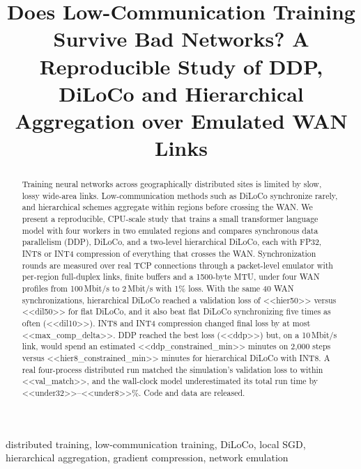 \documentclass[conference]{IEEEtran}
\begin{document}
\title{Does Low-Communication Training Survive Bad Networks? A Reproducible Study of DDP, DiLoCo and Hierarchical Aggregation over Emulated WAN Links}

\author{
}

\maketitle

\begin{abstract}
Training neural networks across geographically distributed sites is limited by slow, lossy wide-area links. Low-communication methods such as DiLoCo synchronize rarely, and hierarchical schemes aggregate within regions before crossing the WAN. We present a reproducible, CPU-scale study that trains a small transformer language model with four workers in two emulated regions and compares synchronous data parallelism (DDP), DiLoCo, and a two-level hierarchical DiLoCo, each with FP32, INT8 or INT4 compression of everything that crosses the WAN. Synchronization rounds are measured over real TCP connections through a packet-level emulator with per-region full-duplex links, finite buffers and a 1500-byte MTU, under four WAN profiles from 100\,Mbit/s to 2\,Mbit/s with 1\% loss. With the same 40 WAN synchronizations, hierarchical DiLoCo reached a validation loss of <<hier50>> versus <<dil50>> for flat DiLoCo, and it also beat flat DiLoCo synchronizing five times as often (<<dil10>>). INT8 and INT4 compression changed final loss by at most <<max_comp_delta>>. DDP reached the best loss (<<ddp>>) but, on a 10\,Mbit/s link, would spend an estimated <<ddp_constrained_min>> minutes on 2,000 steps versus <<hier8_constrained_min>> minutes for hierarchical DiLoCo with INT8. A real four-process distributed run matched the simulation's validation loss to within <<val_match>>, and the wall-clock model underestimated its total run time by <<under32>>--<<under8>>\%. Code and data are released.
\end{abstract}

\begin{IEEEkeywords}
distributed training, low-communication training, DiLoCo, local SGD, hierarchical aggregation, gradient compression, network emulation
\end{IEEEkeywords}
\end{document}

